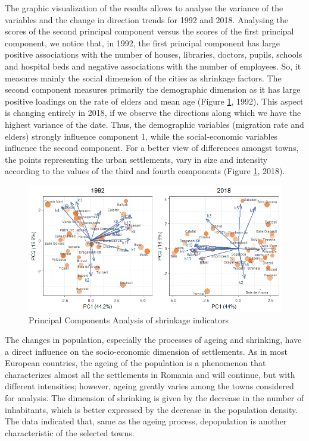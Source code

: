 The graphic visualization of the results allows to analyse the variance of the variables and the change in direction trends for 1992 and 2018. Analysing the scores of the second principal component versus the scores of the first principal component, we notice that, in 1992, the first principal component has large positive associations with the number of houses, libraries, doctors, pupils, schools and hospital beds and negative associations with the number of employees. So, it measures mainly the social dimension of the cities as shrinkage factors. The second component measures primarily the demographic dimension as it has large positive loadings on the rate of elders and mean age (Figure \ref{figure:pca}, 1992). This aspect is changing entirely in 2018, if we observe the directions along which we have the highest variance of the date. Thus, the demographic variables (migration rate and elders) strongly influence component 1, while the social-economic variables influence the second component. For a better view of differences amongst towns, the points representing the urban settlements, vary in size and intensity according to the values of the third and fourth components (Figure \ref{figure:pca}, 2018).

\begin{figure}[htbp]
	\centering
	\includegraphics[width=1\textwidth]{pca}
	\caption{Principal Components Analysis of shrinkage indicators}
	\label{figure:pca}
\end{figure}

The changes in population, especially the processes of ageing and shrinking, have a direct influence on the socio-economic dimension of settlements. As in most European countries, the ageing of the population is a phenomenon that characterizes almost all the settlements in Romania and will continue, but with different intensities; however, ageing greatly varies among the towns considered for analysis. The dimension of shrinking is given by the decrease in the number of inhabitants, which is better expressed by the decrease in the population density. The data indicated that, same as the ageing process, depopulation is another characteristic of the selected towns.

